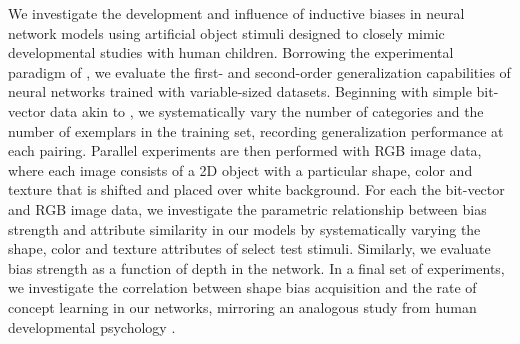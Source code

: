 We investigate the development and influence of inductive biases in neural
network models using artificial object stimuli designed to closely mimic
developmental studies with human children. Borrowing the experimental paradigm
of \cite{Smith2002}, we evaluate the first- and second-order generalization
capabilities of neural networks trained with variable-sized datasets. Beginning
with simple bit-vector data akin to \cite{Colunga2005}, we systematically vary
the number of categories and the number of exemplars in the training set,
recording generalization performance at each pairing. Parallel experiments are
then performed with RGB image data, where each image consists of a 2D object
with a particular shape, color and texture that is shifted and placed over
white background. For each the bit-vector and RGB image data, we investigate
the parametric relationship between bias strength and attribute similarity in
our models by systematically varying the shape, color and texture attributes of
select test stimuli. Similarly, we evaluate bias strength as a function of
depth in the network. In a final set of experiments, we investigate the
correlation between shape bias acquisition and the rate of concept learning in
our networks, mirroring an analogous study from human developmental psychology
\citep{GershkoffStowe2004}.



